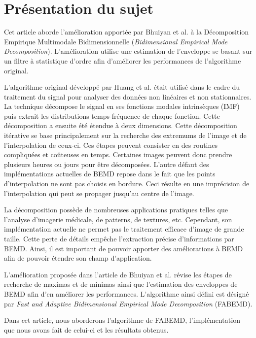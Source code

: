 \chapter{Présentation du sujet}

Cet article aborde l'amélioration apportée par Bhuiyan et al. \cite{BhuiyanAK08} à la Décomposition Empirique Multimodale
Bidimensionnelle (\textit{Bidimensional Empirical Mode Decomposition}). L'amélioration utilise une estimation de l'enveloppe se basant sur un filtre à statistique d'ordre afin d'améliorer les performances de l'algorithme original.

L'algorithme original développé par Huang et al. \cite{HuangSL98} était utilisé dans le cadre du traitement du signal pour analyser des données non linéaires et non stationnaires. La technique décompose le signal en ses fonctions modales intrinsèques (IMF) puis extrait les distributions temps-fréquence de chaque fonction. Cette décomposition a ensuite été étendue à deux dimensions. Cette décomposition itérative se base principalement sur la recherche des extremums de l'image et de l'interpolation de ceux-ci. Ces étapes peuvent consister en des routines compliquées et coûteuses en temps. Certaines images peuvent donc prendre plusieurs heures ou jours pour être décomposées. L'autre défaut des implémentations actuelles de BEMD repose dans le fait que les points d'interpolation ne sont pas choisis en bordure. Ceci résulte en une imprécision de l'interpolation qui peut se propager jusqu'au centre de l'image.

La décomposition possède de nombreuses applications pratiques telles que l'analyse d'imagerie médicale, de patterns, de textures, etc. Cependant, son implémentation actuelle ne permet pas le traitement efficace d'image de grande taille. Cette perte de détails empêche l'extraction précise d'informations par BEMD. Ainsi, il est important de pouvoir apporter des améliorations à BEMD afin de pouvoir étendre son champ d'application.

L'amélioration proposée dans l'article de Bhuiyan et al. révise les étapes de recherche de maximas et de minimas ainsi que l'estimation des enveloppes de BEMD afin d'en améliorer les performances. L'algorithme ainsi défini est désigné par \textit{Fast and Adaptive Bidimensional Empirical Mode Decomposition} (FABEMD).

Dans cet article, nous aborderons l'algorithme de FABEMD, l'implémentation que nous avons fait de celui-ci et les résultats obtenus.